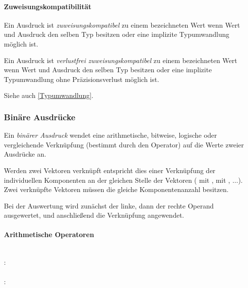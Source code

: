 \paragraph{Zuweisungskompatibilität}\label{Zuweisungskompatibilitaet}

Ein Ausdruck ist \emph{zuweisungskompatibel} zu einem bezeichneten Wert wenn
Wert und Ausdruck den selben Typ besitzen oder eine implizite Typumwandlung
möglich ist.

Ein Ausdruck ist \emph{verlustfrei zuweisungskompatibel} zu einem bezeichneten Wert
wenn Wert und Ausdruck den selben Typ besitzen oder eine implizite Typumwandlung
ohne Präzisionsverlust möglich ist.

Siehe auch \ref{Typumwandlung}.


\subsubsection{Binäre Ausdrücke}\label{Binaere Ausdruecke}

Ein \emph{binärer Ausdruck} wendet eine arithmetische, bitweise, logische oder vergleichende Verknüpfung
(bestimmt durch den Operator) auf die Werte zweier Ausdrücke an.

Werden zwei Vektoren verknüpft entspricht dies einer Verknüpfung der individuellen Komponenten an der gleichen
Stelle der Vektoren ( mit ,  mit , $\dots$). Zwei verknüpfte Vektoren müssen
die gleiche Komponentenanzahl besitzen.

Bei der Auswertung wird zunächst der linke, dann der rechte Operand ausgewertet, und an\-schließend die Verknüpfung angewendet.

\paragraph{Arithmetische Operatoren}\label{Arithmetische Operatoren}
~\\
:\label{asdr_add}\\
\hspace*{1cm} \Gspace{}\\
:\label{asdr_mult}\\
\hspace*{1cm} \Gspace{}\\

